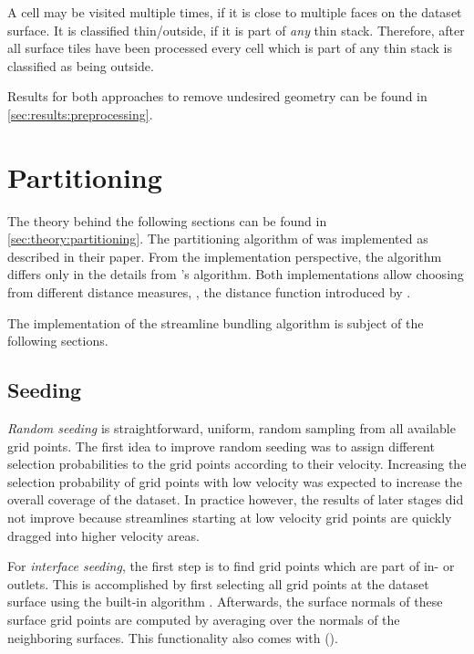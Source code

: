 A cell may be visited multiple times, if it is close to multiple faces on the dataset surface. It is classified thin\slash outside, if it is part of \emph{any} thin stack. Therefore, after all surface tiles have been processed every cell which is part of any thin stack is classified as being outside.

Results for both approaches to remove undesired geometry can be found in \autoref{sec:results:preprocessing}.


\section{Partitioning}

The theory behind the following sections can be found in \autoref{sec:theory:partitioning}.
The partitioning algorithm of  was implemented as described in their paper. %
From the implementation perspective, the \kMeans algorithm differs only in the details from 's algorithm. %
Both implementations allow choosing from different distance measures, \eg, the distance function introduced by .

The implementation of the streamline bundling algorithm is subject of the following sections.


\subsection{Seeding}

\emph{Random seeding} is straightforward, uniform, random sampling from all available grid points. The first idea to improve random seeding was to assign different selection probabilities to the grid points according to their velocity. Increasing the selection probability of grid points with low velocity was expected to increase the overall coverage of the dataset. In practice however, the results of later stages did not improve because streamlines starting at low velocity grid points are quickly dragged into higher velocity areas.


For \emph{interface seeding}, the first step is to find grid points which are part of in- or outlets. This is accomplished by first selecting all grid points at the dataset surface using the built-in \vtk algorithm . Afterwards, the surface normals of these surface grid points are computed by averaging over the normals of the neighboring surfaces. This functionality also comes with \vtk ().

